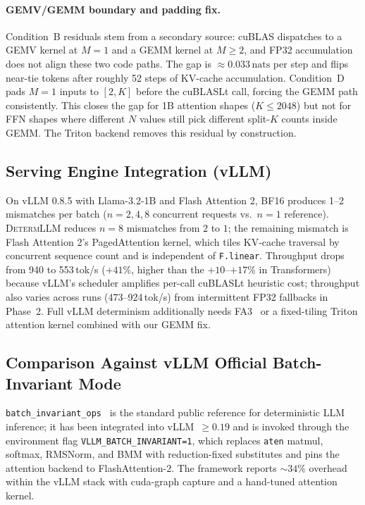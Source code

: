 \documentclass{article}
\newcommand{\dllm}{\textsc{DetermLLM}\xspace}
\newcommand{\nats}{\,\text{nats}\xspace}
\begin{document}
\paragraph{GEMV/GEMM boundary and padding fix.}
Condition~B residuals stem from a secondary source: cuBLAS dispatches to a
GEMV kernel at $M\!=\!1$ and a GEMM kernel at $M\!\ge\!2$, and FP32
accumulation does not align these two code paths. The gap is
$\approx\!0.033\nats$ per step and flips near-tie tokens after roughly 52
steps of KV-cache accumulation. Condition~D pads $M\!=\!1$ inputs to
$[2,K]$ before the cuBLASLt call, forcing the GEMM path consistently. This
closes the gap for 1B attention shapes ($K\!\le\!2048$) but not for FFN
shapes where different $N$ values still pick different split-$K$ counts
inside GEMM. The Triton backend removes this residual by construction.

\subsection{Serving Engine Integration (vLLM)}
\label{sec:vllm}

On vLLM 0.8.5 with Llama-3.2-1B and Flash Attention 2, BF16 produces 1--2
mismatches per batch ($n\!=\!2,4,8$ concurrent requests vs.\ $n\!=\!1$
reference). \dllm reduces $n\!=\!8$ mismatches from $2$ to $1$; the remaining
mismatch is Flash Attention 2's PagedAttention kernel, which tiles KV-cache
traversal by concurrent sequence count and is independent of \texttt{F.linear}.
Throughput drops from 940 to 553\,tok/s ($+41\%$, higher than the $+10$--$+17\%$
in Transformers) because vLLM's scheduler amplifies per-call cuBLASLt
heuristic cost; throughput also varies across runs (473--924\,tok/s) from
intermittent FP32 fallbacks in Phase~2. Full vLLM determinism additionally
needs FA3~\citep{shah2024flashattention3} or a fixed-tiling Triton attention
kernel combined with our GEMM fix.

\subsection{Comparison Against vLLM Official Batch-Invariant Mode}
\label{sec:vllm_bi}

\texttt{batch\_invariant\_ops}~\citep{batchinvariantops2024} is the standard
public reference for deterministic LLM inference; it has been integrated into
vLLM~$\ge\!0.19$ and is invoked through the environment flag
\texttt{VLLM\_BATCH\_INVARIANT=1}, which replaces \texttt{aten} matmul,
softmax, RMSNorm, and BMM with reduction-fixed substitutes and pins the
attention backend to FlashAttention-2. The framework reports $\sim\!34\%$
overhead within the vLLM stack with cuda-graph capture and a hand-tuned
attention kernel.
\end{document}
